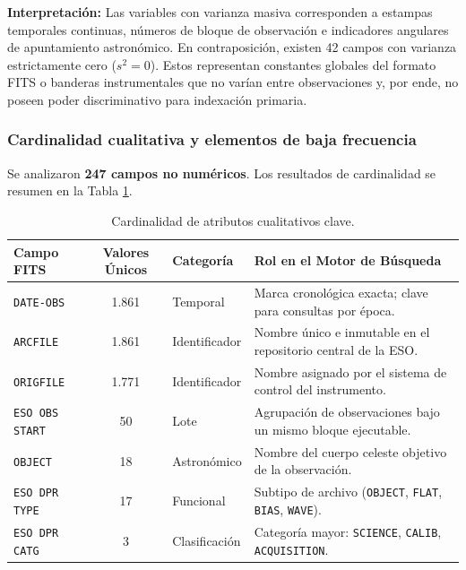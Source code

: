 \documentclass[10pt]{article}
\begin{document}
\textbf{Interpretación:} Las variables con varianza masiva corresponden a estampas temporales continuas, números de bloque de observación e indicadores angulares de apuntamiento astronómico. En contraposición, existen 42 campos con varianza estrictamente cero ($s^2=0$). Estos representan constantes globales del formato FITS o banderas instrumentales que no varían entre observaciones y, por ende, no poseen poder discriminativo para indexación primaria.

\subsubsection{Cardinalidad cualitativa y elementos de baja frecuencia}
Se analizaron \textbf{247 campos no numéricos}. Los resultados de cardinalidad se resumen en la Tabla \ref{tab:cardinalidad}.

\begin{table}[ht]
\centering
\small
\caption{Cardinalidad de atributos cualitativos clave.}
\label{tab:cardinalidad}
\begin{tabularx}{\textwidth}{lclX}
\toprule
\textbf{Campo FITS} & \textbf{Valores Únicos} & \textbf{Categoría} & \textbf{Rol en el Motor de Búsqueda} \\
\midrule
\texttt{DATE-OBS} & 1.861 & Temporal & Marca cronológica exacta; clave para consultas por época. \\
\texttt{ARCFILE} & 1.861 & Identificador & Nombre único e inmutable en el repositorio central de la ESO. \\
\texttt{ORIGFILE} & 1.771 & Identificador & Nombre asignado por el sistema de control del instrumento. \\
\texttt{ESO OBS START} & 50 & Lote & Agrupación de observaciones bajo un mismo bloque ejecutable. \\
\texttt{OBJECT} & 18 & Astronómico & Nombre del cuerpo celeste objetivo de la observación. \\
\texttt{ESO DPR TYPE} & 17 & Funcional & Subtipo de archivo (\texttt{OBJECT}, \texttt{FLAT}, \texttt{BIAS}, \texttt{WAVE}). \\
\texttt{ESO DPR CATG} & 3 & Clasificación & Categoría mayor: \texttt{SCIENCE}, \texttt{CALIB}, \texttt{ACQUISITION}. \\
\bottomrule
\end{tabularx}
\end{table}
\end{document}
